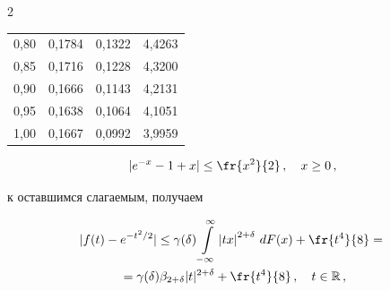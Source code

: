 \begin{multicols}{2}
{\begin{center}
\begin{tabular}{|c|c|c|c|}


 0,80 & 0,1784 & 0,1322 & 4,4263 \\




 0,85 & 0,1716 & 0,1228 & 4,3200 \\




 0,90 & 0,1666 & 0,1143 & 4,2131 \\




 0,95 & 0,1638 & 0,1064 & 4,1051 \\




 1,00 & 0,1667 & 0,0992 & 3,9959 \\


\hline


\end{tabular}


\end{center}




\vspace*{4pt}





}








\bigskip


\addtocounter{table}{1}








$$


|e^{-x}-1+x|\le \fr{x^2}{2}\,,\quad x\ge0\,,


$$


к оставшимся слагаемым, получаем


\begin{multline*}


|f(t)-e^{-t^2/2}|\le


\gamma(\delta)\int\limits_{-\infty}^\infty\left|tx\right|^{2+\delta}\,dF(x)+


\fr{t^4}{8}={}\\


{}= \gamma(\delta)\bet|t|^{2+\delta}+\fr{t^4}{8}\,,\quad t\in\R\,,


\end{multline*}



\end{multicols}
